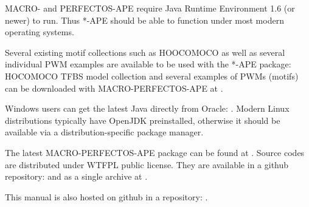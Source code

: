 MACRO- and PERFECTOS-APE require Java Runtime Environment 1.6 (or newer) to run.
Thus *-APE should be able to function under most modern operating systems.

Several existing motif collections such as HOOCOMOCO as well as several individual PWM examples are available to be used with the *-APE package:
HOCOMOCO  TFBS model collection and several examples of PWMs (motifs) can be downloaded with MACRO-PERFECTOS-APE at .

Windows users can get the latest Java directly from Oracle: .
Modern Linux distributions typically have OpenJDK preinstalled, otherwise it should be available via a distribution-specific package manager.

The latest MACRO-PERFECTOS-APE package can be found at . Source codes are distributed under WTFPL public license. They are available in a github repository:  and as a single archive at .

This manual is also hosted on github in a repository: .

